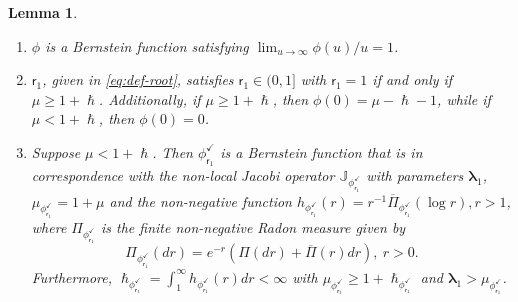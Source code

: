 \documentclass[JEP,XML,SOM,Unicode]{cedram}
\theoremstyle{plain}
\newtheorem{lemma}[theorem]{Lemma}
\theoremstyle{definition}
\newcommand{\calJ}{\mathds{J}}
\newcommand{\lam}{{\bm{\lambda}_1}}
\newcommand{\vat}{{\mathsf{r}_1}}
\renewcommand{\varphi}{{\phi_{\vat}^{\checkmark}}}
\let\h\hslash
\let\mo\mu
\begin{document}
\skpt
\begin{lemma}
\label{lem:phi-Psi1-claims}
\begin{enumerate}
\item \label{item-0:lem:phi-Psi1-claims} $\phi$ is a Bernstein function satisfying $\lim_{u\to\infty} \phi(u)/u =1$.
\item \label{item-1:lem:phi-Psi1-claims}
$\vat$, given in \eqref{eq:def-root}, satisfies $\vat \in (0,1]$ with $\vat = 1$ if and only if $\mo \geq 1+\h$. Additionally, if $\mo \geq 1+\h$, then $\phi(0) = \mo-\h - 1$, while if $\mo < 1+\h$, then $\phi(0) = 0$.

\item \label{item-2:lem:phi-Psi1-claims}
Suppose $\mo < 1+\h$. Then $\varphi$ is a Bernstein function that is in correspondence with the non-local Jacobi operator $\calJ_\varphi$ with parameters $\lam$, $\mo_\varphi = 1+\mo$ and the non-negative function $h_\varphi(r)=r^{-1}\overline{\Pi}_\varphi(\log r), r>1$, where $\Pi_\varphi$ is the finite non-negative Radon measure given by
\begin{equation*}
\Pi_\varphi(dr) = e^{-r}\left(\Pi(dr)+\overline{\Pi}(r)dr\right), \ r > 0.
\end{equation*}
Furthermore, $\h_\varphi = \int_1^\infty h_\varphi(r)dr < \infty$ with $\mo_\varphi \geq 1+\h_\varphi$ and $\lam > \mo_\varphi$.
\end{enumerate}
\end{lemma}
\end{document}
